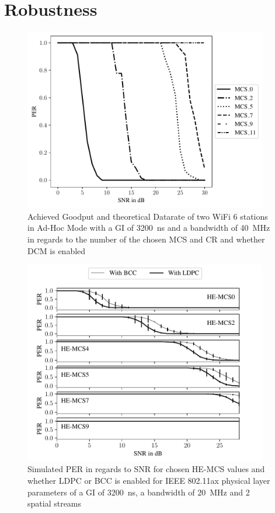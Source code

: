 \section{Robustness}

\begin{figure}%
	\centering
	\includegraphics[width=0.95\textwidth]{figures/MCS_PER_to_SNR.pdf}
	\caption{Achieved Goodput and theoretical Datarate of two WiFi 6 stations in Ad-Hoc Mode with a \ac{GI} of \SI{3200}{\nano\second} and a bandwidth of \SI{40}{\mega\hertz} in regards to the number of the chosen \ac{MCS} and \ac{CR} and whether \ac{DCM} is enabled}%
	\label{fig:PER_SNR_MCS}%
\end{figure}


\begin{figure}%
	\centering
	\includegraphics[width=0.95\textwidth]{figures/LDPC_PER_to_SNR.pdf}
	\caption{Simulated \ac{PER} in regards to \ac{SNR} for chosen HE-\ac{MCS} values and whether \ac{LDPC} or \ac{BCC} is enabled for IEEE 802.11ax physical layer parameters of a \ac{GI} of \SI{3200}{\nano\second}, a bandwidth of \SI{20}{\mega\hertz} and 2 spatial streams}%
	\label{fig:PER_SNR_LDPC}%
\end{figure}

